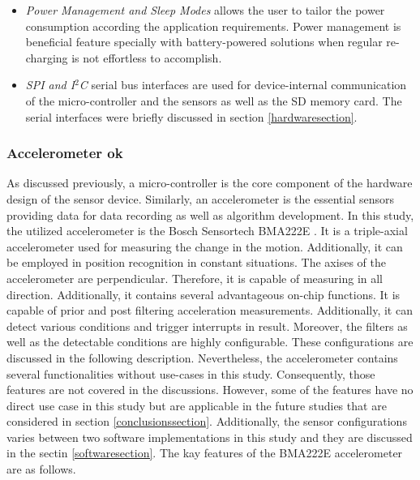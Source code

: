 \documentclass[english,12pt,a4paper,pdftex,elec,utf8]{aaltothesis}
\begin{document}
\begin{itemize}
\item \textit{Power Management and Sleep Modes} allows the user to tailor the power consumption according the application requirements. Power management is beneficial feature specially with battery-powered solutions when regular re-charging is not effortless to accomplish.

\item \textit{SPI and I$^2$C} serial bus interfaces are used for device-internal communication of the micro-controller and the sensors as well as the SD memory card. The serial interfaces were briefly discussed in section \ref{hardwaresection}.

\end{itemize}


\subsubsection*{Accelerometer ok}

As discussed previously, a micro-controller is the core component of the hardware design of the sensor device. Similarly, an accelerometer is the essential sensors providing data for data recording as well as algorithm development. In this study, the utilized accelerometer is the Bosch Sensortech BMA222E \cite{bma222datasheet}. It is a triple-axial accelerometer used for measuring the change in the motion. Additionally, it can be employed in position recognition in constant situations. The axises of the accelerometer are perpendicular. Therefore, it is capable of measuring in all direction. Additionally, it contains several advantageous on-chip functions. It is capable of prior and post filtering acceleration measurements. Additionally, it can detect various conditions and trigger interrupts in result. Moreover, the filters as well as the detectable conditions are highly configurable. These configurations are discussed in the following description. Nevertheless, the accelerometer contains several functionalities without use-cases in this study. Consequently, those features are not covered in the discussions. However, some of the features have no direct use case in this study but are applicable in the future studies that are considered in section \ref{conclusionssection}. Additionally, the sensor configurations varies between two software implementations in this study and they are discussed in the sectin \ref{softwaresection}. The kay features of the BMA222E accelerometer are as follows.
\end{document}
